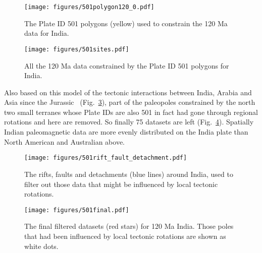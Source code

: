\begin{figure}
\texttt{[image: figures/501polygon120\_0.pdf]}
\caption{The Plate ID 501 polygons (yellow) used to constrain the
120 Ma data for India.}\label{fig_INpolygon}
\end{figure}

\begin{figure}
\texttt{[image: figures/501sites.pdf]}
\caption{All the 120 Ma data constrained by the Plate ID 501
polygons for India.}\label{fig_INpmdata}
\end{figure}

Also based on this model of the tectonic interactions between India, Arabia and
Asia since the Jurassic~\cite{G15} (Fig.~\ref{fig_INrfd}), part of the
paleopoles constrained by the north two small terranes whose Plate IDs are also
501 in fact had gone through regional rotations and here are removed. So finally
75 datasets are left (Fig.~\ref{fig_INfinal}). Spatially Indian paleomagnetic
data are more evenly distributed on the India plate than North American and
Australian above.

\begin{figure}
\texttt{[image: figures/501rift\_fault\_detachment.pdf]}
\caption{The rifts, faults and detachments (blue lines) around India, used to
filter out those data that might be influenced by local tectonic
rotations.}\label{fig_INrfd}
\end{figure}

\begin{figure}
\texttt{[image: figures/501final.pdf]}
\caption{The final filtered datasets (red stars) for 120 Ma India.
Those poles that had been influenced by local tectonic rotations are shown as
white dots.}\label{fig_INfinal}
\end{figure}~\label{lastpage}
